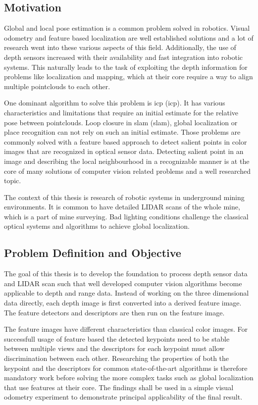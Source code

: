 \subsection{Motivation}

Global and local pose estimation is a common problem solved in robotics.
Visual odometry and feature based localization are well established solutions and a lot of research went into these various aspects of this field.
Additionally, the use of depth sensors increased with their availability and fast integration into robotic systems.
This naturally leads to the task of exploiting the depth information for problems like localization and mapping, which at their core require a way to align multiple pointclouds to each other.

One dominant algorithm to solve this problem is \acrshort{icp} (\acrlong{icp}).
It has various characteristics and limitations that require an initial estimate for the relative pose between pointclouds.
Loop closure in \acrshort{slam} (\acrlong{slam}), global localization or place recognition can not rely on such an initial estimate.
Those problems are commonly solved with a feature based approach to detect salient points in color images that are recognized in optical sensor data.
Detecting salient point in an image and describing the local neighbourhood in a recognizable manner is at the core of many solutions of computer vision related problems and a well researched topic.

The context of this thesis is research of robotic systems in underground mining environments.
It is common to have detailed \acrshort{LIDAR} scans of the whole mine, which is a part of mine surveying.
Bad lighting conditions challenge the classical optical systems and algorithms to achieve global localization.


\subsection{Problem Definition and Objective}

The goal of this thesis is to develop the foundation to process depth sensor data and \acrshort{LIDAR} scan such that well developed computer vision algorithms become applicable to depth and range data.
Instead of working on the three dimensional data directly, each depth image is first converted into a derived feature image.
The feature detectors and descriptors are then run on the feature image.

The feature images have different characteristics than classical color images.
For successfull usage of feature based the detected keypoints need to be stable between multiple views and the descriptors for each keypoint must allow discrimination between each other.
Researching the properties of both the keypoint and the descriptors for common state-of-the-art algorithms is therefore mandatory work before solving the more complex tasks such as global localization that use features at their core.
The findings shall be used in a simple visual odometry experiment to demonstrate principal applicability of the final result.

